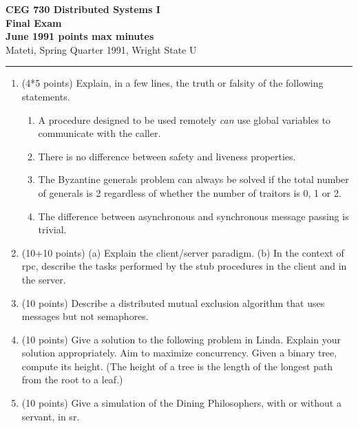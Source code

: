\def\fat{\framebox[1mm]{\rule{0mm}{2mm}}}
\def\CSP{{\sc csp}}
\def\RPC{{\sc rpc}}
\def\SR{{\sc sr}}
\parindent=0pt



{\bf CEG 
\large \bf 730 Distributed Systems I\\[5pt]
\large Final Exam\\[10pt]
June 1991  points max  minutes\\
}
\bigskip
{Mateti,  Spring Quarter 1991, Wright State U}\\[-5pt]
\hrule

\begin{enumerate}

\item (4*5 points)
Explain, in a few lines, the truth or falsity of the following
statements.

\begin{enumerate}
\item
A procedure designed to be used remotely {\em can} use global
variables to communicate with the caller.

\item
There is no difference between safety and liveness properties.

\item
The Byzantine generals problem can always be solved if the total
number of generals is 2 regardless of whether the number of traitors
is 0, 1 or 2.

\item
The difference between asynchronous and synchronous message
passing is trivial.

\end{enumerate}


\item (10+10 points)
(a) Explain the client/server paradigm.  (b) In the context of \RPC,
describe the tasks performed by the stub procedures in the client and
in the server.

\item (10 points)  Describe a distributed mutual exclusion algorithm
that uses messages but not semaphores.

\item (10 points) Give a solution to the following problem in Linda.
Explain your solution appropriately.  Aim to maximize concurrency.
Given a binary tree, compute its height. (The height of a tree is the
length of the longest path from the root to a leaf.)

\item (10 points) Give a simulation of the Dining Philosophers, with or
without a servant, in \SR.


\end{enumerate}
